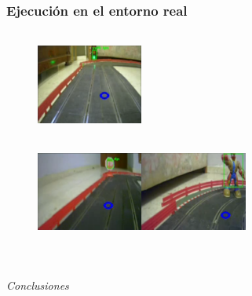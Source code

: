 \documentclass{beamer}
\makeatletter
\newenvironment{conditions*}
{\par\vspace{\abovedisplayskip}\noindent
\tabularx{\columnwidth}{>{$}l<{$} @{\ : } >{\raggedright\arraybackslash}X}}
{\endtabularx\par\vspace{\belowdisplayskip}}
\makeatother
\begin{document}
\begin{frame}
	\frametitle{Ejecución en el entorno real}
	\begin{figure}
		\centering
		\includegraphics[width=3.5cm, height=3.5cm]{figs/screenshottrafficlight}\\\vspace{0.5cm}
		\includegraphics[width=3.5cm,
			height=3.5cm]{figs/screenshotstopsign}\hspace{1cm}\includegraphics[width=3.5cm, height=3.5cm]{figs/screenshotpedestrian}
	\end{figure}
\end{frame}



\section*{}
\begin{frame}{}
	\centering \Huge
	\emph{Conclusiones}
\end{frame}
\end{document}
